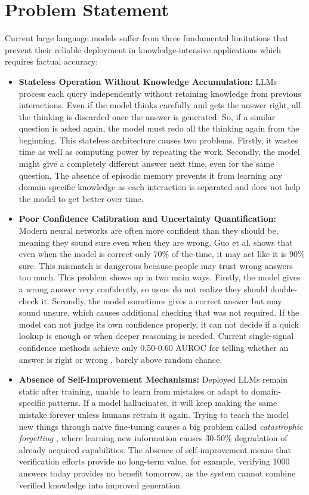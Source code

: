 \section{Problem Statement}

Current large language models suffer from three fundamental limitations that prevent their reliable deployment in knowledge-intensive applications which requires factual accuracy:

\begin{itemize}
    \item \textbf{Stateless Operation Without Knowledge Accumulation:} LLMs process each query independently without retaining knowledge from previous interactions. Even if the model thinks carefully and gets the answer right, all the thinking is discarded once the answer is generated. So, if a similar question is asked again, the model must redo all the thinking again from the beginning. This stateless architecture causes two problems. Firstly, it wastes time as well as computing power by repeating the work. Secondly, the model might give a completely different answer next time, even for the same question. The absence of episodic memory prevents it from learning any domain-specific knowledge as each interaction is separated and does not help the model to get better over time.
    
    \item \textbf{Poor Confidence Calibration and Uncertainty Quantification:} Modern neural networks are often more confident than they should be, meaning they sound sure even when they are wrong. Guo et al. \cite{pmlr-v70-guo17a} shows that even when the model is correct only 70\% of the time, it may act like it is 90\% sure. This mismatch is dangerous because people may trust wrong answers too much. This problem shows up in two main ways. Firstly, the model gives a wrong answer very confidently, so users do not realize they should double-check it. Secondly, the model sometimes gives a correct answer but may sound unsure, which causes additional checking that was not required. If the model can not judge its own confidence properly, it can not decide if a quick lookup is enough or when deeper reasoning is needed. Current single-signal confidence methods achieve only 0.50-0.60 AUROC for telling whether an answer is right or wrong \cite{xiong2023can}, barely above random chance.
    
    \item \textbf{Absence of Self-Improvement Mechanisms:} Deployed LLMs remain static after training, unable to learn from mistakes or adapt to domain-specific patterns. If a model hallucinates, it will keep making the same mistake forever unless humans retrain it again. Trying to teach the model new things through naive fine-tuning causes a big problem called \textit{catastrophic forgetting} \cite{doi:10.1073/pnas.1611835114}, where learning new information causes 30-50\% degradation of already acquired capabilities. The absence of self-improvement means that verification efforts provide no long-term value, for example, verifying 1000 answers today provides no benefit tomorrow, as the system cannot combine verified knowledge into improved generation.
\end{itemize}

